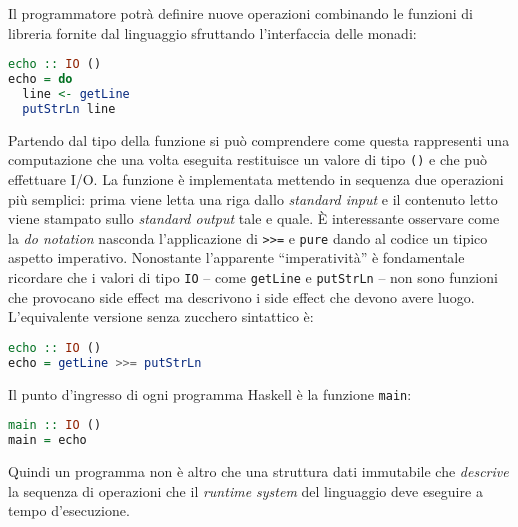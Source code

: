 Il programmatore potrà definire nuove operazioni combinando le funzioni di libreria fornite dal linguaggio sfruttando l'interfaccia delle monadi:
\begin{lstlisting}[language=haskell]
echo :: IO ()
echo = do
  line <- getLine
  putStrLn line
\end{lstlisting}
Partendo dal tipo della funzione si può comprendere come questa rappresenti una computazione che una volta eseguita restituisce un valore di tipo \lstinline{()} e che può effettuare I/O. La funzione è implementata mettendo in sequenza due operazioni più semplici: prima viene letta una riga dallo \emph{standard input} e il contenuto letto viene stampato sullo \emph{standard output} tale e quale.
È interessante osservare come la \emph{do notation} nasconda l'applicazione di \lstinline{>>=} e \lstinline{pure} dando al codice un tipico aspetto imperativo. Nonostante l'apparente ``imperatività'' è fondamentale ricordare che i valori di tipo \lstinline{IO} -- come \lstinline{getLine} e \lstinline{putStrLn} -- non sono funzioni che provocano side effect ma descrivono i side effect che devono avere luogo. L'equivalente versione senza zucchero sintattico è:
\begin{lstlisting}[language=haskell]
echo :: IO ()
echo = getLine >>= putStrLn
\end{lstlisting}

Il punto d'ingresso di ogni programma Haskell è la funzione \lstinline{main}:
\begin{lstlisting}[language=haskell]
main :: IO ()
main = echo
\end{lstlisting}
Quindi un programma non è altro che una struttura dati immutabile che \emph{descrive} la sequenza di operazioni che il \emph{runtime system} del linguaggio deve eseguire a tempo d'esecuzione.

